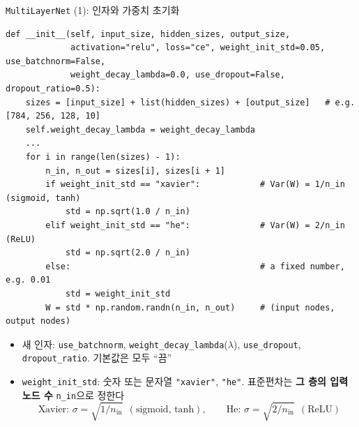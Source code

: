 \documentclass[aspectratio=169,11pt]{beamer}
\newcommand{\codetiny}{\ttfamily\fontsize{6.8}{7.6}\selectfont}
\newcommand{\code}[1]{\texttt{#1}}
\begin{document}
\begin{frame}[fragile]{\code{MultiLayerNet} (1): 인자와 가중치 초기화}
\begin{lstlisting}[basicstyle=\codetiny]
def __init__(self, input_size, hidden_sizes, output_size,
             activation="relu", loss="ce", weight_init_std=0.05, use_batchnorm=False,
             weight_decay_lambda=0.0, use_dropout=False, dropout_ratio=0.5):
    sizes = [input_size] + list(hidden_sizes) + [output_size]   # e.g. [784, 256, 128, 10]
    self.weight_decay_lambda = weight_decay_lambda
    ...
    for i in range(len(sizes) - 1):
        n_in, n_out = sizes[i], sizes[i + 1]
        if weight_init_std == "xavier":            # Var(W) = 1/n_in  (sigmoid, tanh)
            std = np.sqrt(1.0 / n_in)
        elif weight_init_std == "he":              # Var(W) = 2/n_in  (ReLU)
            std = np.sqrt(2.0 / n_in)
        else:                                      # a fixed number, e.g. 0.01
            std = weight_init_std
        W = std * np.random.randn(n_in, n_out)     # (input nodes, output nodes)
\end{lstlisting}
\footnotesize
\begin{itemize}
\item 새 인자: \code{use\_batchnorm}, \code{weight\_decay\_lambda}($\lambda$), \code{use\_dropout}, \code{dropout\_ratio}. 기본값은 모두 ``끔''
\item \code{weight\_init\_std}: 숫자 또는 문자열 \code{"xavier"}, \code{"he"}. 표준편차는 \textbf{그 층의 입력 노드 수} \code{n\_in}으로 정한다
\[
\text{Xavier: } \sigma=\sqrt{1/n_{\text{in}}}\ \ (\text{sigmoid, tanh}),\qquad
\text{He: } \sigma=\sqrt{2/n_{\text{in}}}\ \ (\text{ReLU})
\]
\end{itemize}
\end{frame}
\end{document}
